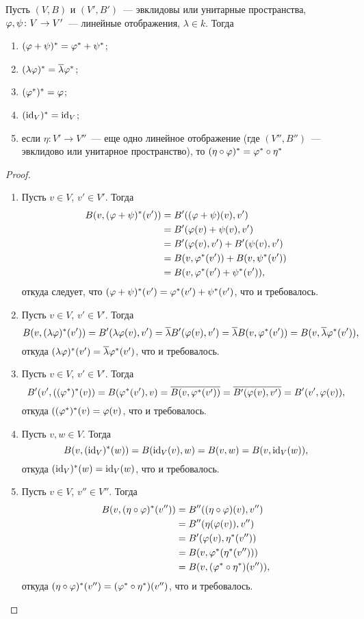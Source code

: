 \begin{proposition}
Пусть $(V,B)$ и $(V',B')$~--- эвклидовы или унитарные пространства,
$\varphi,\psi\colon V\to V'$~--- линейные отображения,
$\lambda\in k$. Тогда
\begin{enumerate}
\item $(\varphi+\psi)^* = \varphi^*+\psi^*$;
\item $(\lambda\varphi)^* = \overline\lambda\varphi^*$;
\item $(\varphi^*)^* = \varphi$;
\item $(\operatorname{id}_V)^* = \operatorname{id}_V$;
\item если $\eta\colon V'\to V''$~--- еще одно линейное отображение
(где $(V'',B'')$~--- эвклидово или унитарное пространство), то
$(\eta\circ\varphi)^* = \varphi^*\circ\eta^*$
\end{enumerate}
\end{proposition}
\begin{proof}
\begin{enumerate}
\item Пусть $v\in V$, $v'\in V'$. Тогда
\begin{align*}
B(v,(\varphi+\psi)^*(v')) &= B'((\varphi+\psi)(v),v') \\
&= B'(\varphi(v) + \psi(v),v') \\
&= B'(\varphi(v),v') + B'(\psi(v),v') \\
&= B(v,\varphi^*(v')) + B(v,\psi^*(v')) \\
&= B(v,\varphi^*(v')+\psi^*(v')),
\end{align*}
откуда следует, что $(\varphi+\psi)^*(v') = \varphi^*(v') + \psi^*(v')$,
что и требовалось.
\item Пусть $v\in V$, $v'\in V'$. Тогда
$$
B(v,(\lambda\varphi)^*(v')) = B'(\lambda\varphi(v),v') =
\overline\lambda B'(\varphi(v),v') = \overline\lambda B(v,\varphi^*(v')) = 
B(v,\overline\lambda\varphi^*(v')),
$$
откуда $(\lambda\varphi)^*(v') = \overline\lambda\varphi^*(v')$, что и требовалось.
\item Пусть $v\in V$, $v'\in V'$. Тогда
$$
B'(v',((\varphi^*)^*(v)) = B(\varphi^*(v'),v) = \overline{B(v,\varphi^*(v'))}
=\overline{B'(\varphi(v),v')} = B'(v',\varphi(v)),
$$
откуда $((\varphi^*)^*(v) = \varphi(v)$, что и требовалось.
\item Пусть $v,w\in V$. Тогда
$$
B(v,(\operatorname{id}_V)^*(w)) = B(\operatorname{id}_V(v),w) = B(v,w) = B(v,\operatorname{id}_V(w)),
$$
откуда $(\operatorname{id}_V)^*(w) = \operatorname{id}_V(w)$, что и требовалось.
\item Пусть $v\in V$, $v''\in V''$. Тогда
\begin{align*}
B(v,(\eta\circ\varphi)^*(v'')) &= B''((\eta\circ\varphi)(v),v'') \\
&= B''(\eta(\varphi(v)),v'') \\
&= B'(\varphi(v),\eta^*(v'')) \\
&= B(v,\varphi^*(\eta^*(v''))) \\
&= B(v,(\varphi^*\circ\eta^*)(v'')),
\end{align*}
откуда $(\eta\circ\varphi)^*(v'') = (\varphi^*\circ\eta^*)(v'')$,
что и требовалось.
\end{enumerate}
\end{proof}

